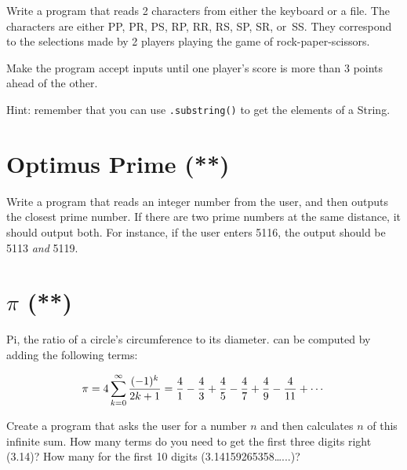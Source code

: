 \documentclass{article}
\begin{document}
Write a program that reads 2 characters from either the keyboard or a
file. The characters are either PP, PR, PS, RP, RR, RS, SP, SR,
or~SS. They correspond to the selections made by 2 players playing the 
game of rock-paper-scissors. 

Make the program accept inputs until one player's score is more than 3
points ahead of the other. 

Hint: remember that you can use \verb+.substring()+ to get the
elements of a String. 

\section{Optimus Prime (**)}
\label{sec:optimus-prime}

Write a program that reads an integer number from the user, and then
outputs the closest prime number. If there are two prime numbers at
the same distance, it should output both. For instance, if the user
enters 5116, the output should be 5113 \emph{and} 5119. 

\section{$\pi$ (**)}
\label{sec:pi-}

Pi, the ratio of a circle's circumference to its diameter. 
can be computed by adding the following terms: 

$$ \pi = 4 \sum^{\infty}_{k=0} {(-1)^k \over 2k+1} = 
  {4 \over 1} - {4 \over 3} + {4 \over 5} - {4 \over 7} 
  + {4 \over 9} - {4 \over 11} + \cdots $$

Create a program that asks the user for a number $n$ and then
calculates $n$ of this infinite sum. How many terms do you need to get
the first three digits right (3.14)? How many for the first 10 digits
(3.14159265358\ldots...)?
\end{document}
